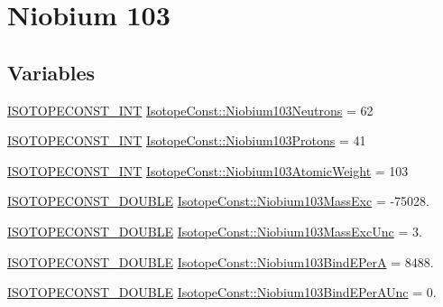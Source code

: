 \hypertarget{group___isotope_const-_niobium-_nb103}{}\section{Niobium 103}
\label{group___isotope_const-_niobium-_nb103}
\subsection*{Variables}
\begin{DoxyCompactItemize}
\item 
\mbox{\hyperlink{group___isotope_const-_macros_ga5f18360b3e99483a35c32d789e62621c}{I\+S\+O\+T\+O\+P\+E\+C\+O\+N\+S\+T\+\_\+\+I\+NT}} \mbox{\hyperlink{group___isotope_const-_niobium-_nb103_ga647f6bbcd8dc4cbeca6daa3cd6c3de0b}{Isotope\+Const\+::\+Niobium103\+Neutrons}} = 62
\item 
\mbox{\hyperlink{group___isotope_const-_macros_ga5f18360b3e99483a35c32d789e62621c}{I\+S\+O\+T\+O\+P\+E\+C\+O\+N\+S\+T\+\_\+\+I\+NT}} \mbox{\hyperlink{group___isotope_const-_niobium-_nb103_gac90dd265d326775b582aafc27c6721e5}{Isotope\+Const\+::\+Niobium103\+Protons}} = 41
\item 
\mbox{\hyperlink{group___isotope_const-_macros_ga5f18360b3e99483a35c32d789e62621c}{I\+S\+O\+T\+O\+P\+E\+C\+O\+N\+S\+T\+\_\+\+I\+NT}} \mbox{\hyperlink{group___isotope_const-_niobium-_nb103_gaf319d611f512c0e18e0d45daf6c60d9b}{Isotope\+Const\+::\+Niobium103\+Atomic\+Weight}} = 103
\item 
\mbox{\hyperlink{group___isotope_const-_macros_ga8f45a7272ce02c0b4c65c44636ed719a}{I\+S\+O\+T\+O\+P\+E\+C\+O\+N\+S\+T\+\_\+\+D\+O\+U\+B\+LE}} \mbox{\hyperlink{group___isotope_const-_niobium-_nb103_gae0a60f256a0d0b47ef552bb4cffe0491}{Isotope\+Const\+::\+Niobium103\+Mass\+Exc}} = -\/75028.
\item 
\mbox{\hyperlink{group___isotope_const-_macros_ga8f45a7272ce02c0b4c65c44636ed719a}{I\+S\+O\+T\+O\+P\+E\+C\+O\+N\+S\+T\+\_\+\+D\+O\+U\+B\+LE}} \mbox{\hyperlink{group___isotope_const-_niobium-_nb103_gaaf190ded85e30efb7081c2bd020b00fe}{Isotope\+Const\+::\+Niobium103\+Mass\+Exc\+Unc}} = 3.
\item 
\mbox{\hyperlink{group___isotope_const-_macros_ga8f45a7272ce02c0b4c65c44636ed719a}{I\+S\+O\+T\+O\+P\+E\+C\+O\+N\+S\+T\+\_\+\+D\+O\+U\+B\+LE}} \mbox{\hyperlink{group___isotope_const-_niobium-_nb103_ga43223c880edad3aafde03f828d1d3b06}{Isotope\+Const\+::\+Niobium103\+Bind\+E\+PerA}} = 8488.
\item 
\mbox{\hyperlink{group___isotope_const-_macros_ga8f45a7272ce02c0b4c65c44636ed719a}{I\+S\+O\+T\+O\+P\+E\+C\+O\+N\+S\+T\+\_\+\+D\+O\+U\+B\+LE}} \mbox{\hyperlink{group___isotope_const-_niobium-_nb103_ga2dda3b565bca1d35a8016d01c5baca35}{Isotope\+Const\+::\+Niobium103\+Bind\+E\+Per\+A\+Unc}} = 0.

\end{DoxyCompactItemize}
